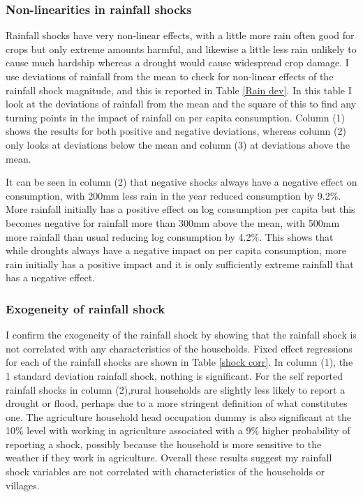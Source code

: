 \subsubsection{Non-linearities in rainfall shocks}
Rainfall shocks have very non-linear effects, with a little more rain often good for crops but only extreme amounts harmful, and likewise a little less rain unlikely to cause much hardship whereas a drought would cause widespread crop damage. I use deviations of rainfall from the mean to check for non-linear effects of the rainfall shock magnitude, and this is reported in Table \ref{Rain dev}. In this table I look at the deviations of rainfall from the mean and the square of this to find any turning points in the impact of rainfall on per capita consumption. Column (1) shows the results for both positive and negative deviations, whereas column (2) only looks at deviations below the mean and column (3) at deviations above the mean. 

It can be seen in column (2) that negative shocks always have a negative effect on consumption, with 200mm less rain in the year reduced consumption by 9.2\%. More rainfall initially has a positive effect on log consumption per capita but this becomes negative for rainfall more than 300mm above the mean, with 500mm more rainfall than usual reducing log consumption by 4.2\%. This shows that while droughts always have a negative impact on per capita consumption, more rain initially has a positive impact and it is only sufficiently extreme rainfall that has a negative effect. 


\subsubsection{Exogeneity of rainfall shock}
I confirm the exogeneity of the rainfall shock by showing that the rainfall shock is not correlated with any characteristics of the households. Fixed effect regressions for each of the rainfall shocks are shown in Table \ref{shock corr}. In column (1), the 1 standard deviation rainfall shock, nothing is significant. For the self reported rainfall shocks in column (2),rural households are slightly less likely to report a drought or flood, perhaps due to a more stringent definition of what constitutes one. The agriculture household head occupation dummy is also significant at the 10\% level with working in agriculture associated with a 9\% higher probability of reporting a shock, possibly because the household is more sensitive to the weather if they work in agriculture. Overall these results suggest my rainfall shock variables are not correlated with characteristics of the households or villages. 

